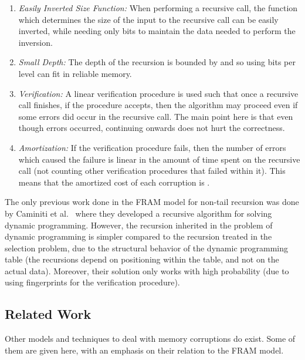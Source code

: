 \documentclass{llncs}
\begin{document}
\begin{enumerate} 

\item \emph{Easily Inverted Size Function:} When performing a recursive call, the function which determines the size of the input to the recursive call can be easily inverted, while needing only  bits to maintain the data needed to perform the inversion.

\item \emph{Small Depth:} The depth of the recursion is bounded by  and so using  bits per level can fit in reliable memory.

\item \emph{Verification:} A linear verification procedure is used such that once a recursive call finishes, if the procedure accepts, then the algorithm may proceed even if some errors did occur in the recursive call. The main point here is that even though errors occurred, continuing onwards does not hurt the correctness.

\item \emph{Amortization:} If the verification procedure fails, then the number of errors which caused the failure is linear in the amount of time spent on the recursive call (not counting other verification procedures that failed within it). This means that the amortized cost of each corruption is .

\end{enumerate}

The only previous work done in the FRAM model for non-tail recursion was done by Caminiti et al.~\cite{dynamic_programming} where they developed a recursive algorithm for solving dynamic programming. However, the recursion inherited in the problem of dynamic programming is simpler compared to the recursion treated in the selection problem, due to the structural behavior of the dynamic programming table (the recursions depend on positioning within the table, and not on the actual data). Moreover, their solution only works with high probability (due to using fingerprints for the verification procedure).





\subsection{Related Work}

Other models and techniques to deal with memory corruptions do exist.
Some of them are given here, with an emphasis on their relation to the FRAM model.
\end{document}

